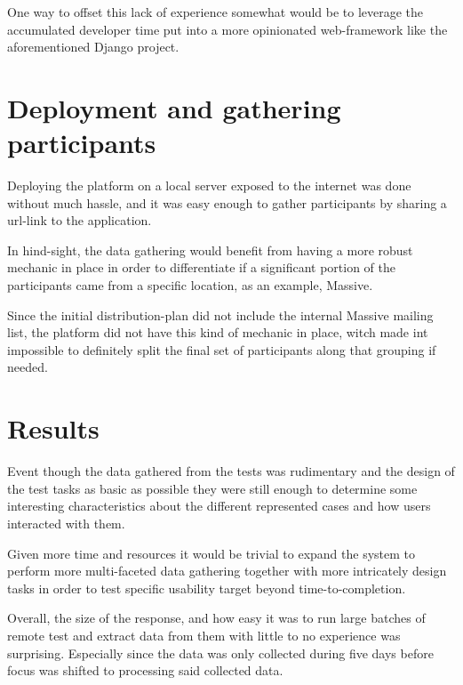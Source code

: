   One way to offset this lack of experience somewhat would be to leverage the
  accumulated developer time put into a more opinionated web-framework like the
  aforementioned Django\cite{citeDjangoHomepage} project.

\section{Deployment and gathering participants}

  Deploying the platform on a local server exposed to the internet was done
  without much hassle, and it was easy enough to gather participants by
  sharing a url-link to the application.

  In hind-sight, the data gathering would benefit from having a more robust
  mechanic in place in order to differentiate if a significant portion of the
  participants came from a specific location, as an example, Massive.

  Since the initial distribution-plan did not include the internal Massive
  mailing list, the platform did not have this kind of mechanic in place, witch
  made int impossible to definitely split the final set of participants along
  that grouping if needed.

\section{Results}

  Event though the data gathered from the tests was rudimentary and the
  design of the test tasks as basic as possible they were still enough to
  determine some interesting characteristics about the different represented
  cases and how users interacted with them.


  Given more time and resources it would be trivial to expand the system to
  perform more multi-faceted data gathering together with more intricately
  design tasks in order to test specific usability target beyond
  time-to-completion.

  Overall, the size of the response, and how easy it was to run large batches
  of remote test and extract data from them with little to no experience was
  surprising. Especially since the data was only collected during five days
  before focus was shifted to processing said collected data.

